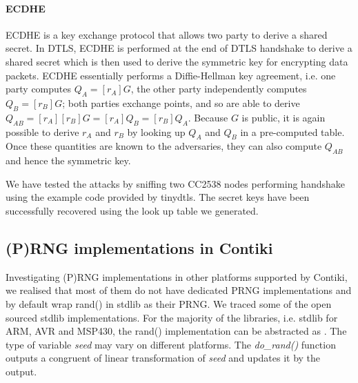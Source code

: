 \paragraph{\textbf{ECDHE}}
	ECDHE\cite{rfc4492} is a key exchange protocol that allows two party to derive a shared secret. In DTLS, ECDHE is performed at the end of DTLS handshake to derive a shared secret which is then used to derive the symmetric key for encrypting data packets. ECDHE essentially performs a Diffie-Hellman key agreement, i.e. one party computes $Q_A = [r_A]G$, the other party independently computes $Q_B = [r_B]G$; both parties exchange points, and so are able to derive  $Q_{AB} = [r_A][r_B]G = [r_A]{Q_B} = [r_B]{Q_A}$. Because $G$ is public, it is again possible to derive $r_A$ and $r_B$ by looking up $Q_A$ and $Q_B$  in a pre-computed table. Once these quantities are known to the adversaries, they can also compute $Q_{AB}$ and hence the symmetric key.


We have tested the attacks by sniffing two CC2538 nodes performing handshake using the example code provided by tinydtls. The secret keys have been successfully recovered using the look up table we generated.

\subsection{(P)RNG implementations in Contiki}\label{PRNGReflection}
Investigating (P)RNG implementations in other platforms supported by Contiki, we realised that most of them do not have dedicated PRNG implementations and by default wrap rand() in stdlib as their PRNG. We traced some of the open sourced stdlib implementations. For the majority of the libraries, i.e. stdlib for ARM\cite{ARMrand}, AVR\cite{AVRrand} and MSP430\cite{MSP430rand}, the rand() implementation can be abstracted as . The type of variable \textit{seed}  may vary on different platforms. The \textit{do\_rand()} function outputs a congruent of linear transformation of \textit{seed} and updates it by the output.
 
